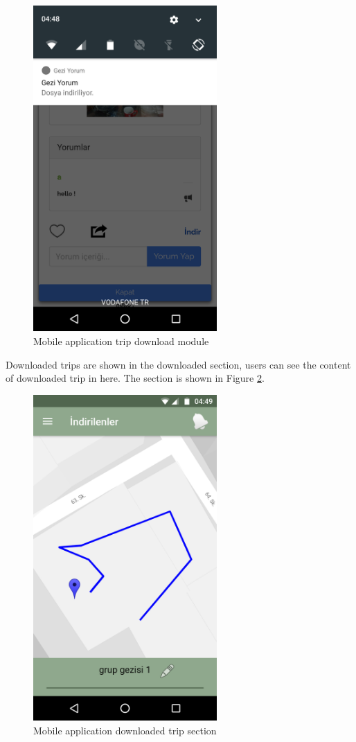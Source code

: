 \begin{figure}[!htbp]
\centering
\includegraphics[width=70mm,scale=0.7]{projectChapters/images/tripDownload.png}
\caption{Mobile application trip download module}
\label{fig:tripDownload}
\end{figure}


\newpage

Downloaded trips are shown in the downloaded section, users can see the content of downloaded trip in here. The section is shown in Figure 
\ref{fig:downloadedTrip}.

\begin{figure}[!htbp]
\centering
\includegraphics[width=70mm,scale=0.7]{projectChapters/images/downloadedTrip.png}
\caption{Mobile application downloaded trip section}
\label{fig:downloadedTrip}
\end{figure}


